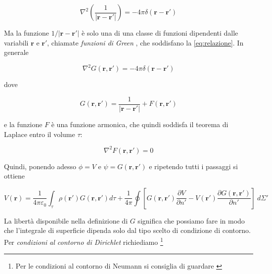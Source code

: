 \begin{equation}
    \nabla^2 \left (\frac{1}{|\mathbf{r} - \mathbf{r'}|} \right ) = - 4 \pi \delta (\mathbf{r} - \mathbf{r'})
    \label{eq:relazione}
\end{equation}

Ma la funzione $1 / |\mathbf{r} - \mathbf{r'}|$ è solo una di una classe di funzioni dipendenti dalle variabili $\mathbf{r}$ e $\mathbf{r'}$, chiamate \emph{funzioni di Green} , che soddisfano la \ref{eq:relazione}. In generale 

\begin{equation}
    \nabla ^2 G(\mathbf{r}, \mathbf{r'}) = -4 \pi \delta (\mathbf{r} -\mathbf{r'})
\end{equation}

dove

\begin{equation}
    G(\mathbf{r}, \mathbf{r'}) = \frac{1}{|\mathbf{r} - \mathbf{r'}|} + F(\mathbf{r}, \mathbf{r'})
    \label{eq:funzione_Green}
\end{equation}

e la funzione $F$ è una funzione armonica, che quindi soddisfa il teorema di Laplace entro il volume $\tau$:

\begin{equation*}
    \nabla ^2 F(\mathbf{r}, \mathbf{r'}) = 0
\end{equation*}

Quindi, ponendo adesso $\phi = V$ e $\psi = G(\mathbf{r}, \mathbf{r'})$ e ripetendo tutti i passaggi si ottiene 

\begin{tcolorbox}[colback=yellow!10!white, colframe=orange!70!black, boxrule=0.8pt]
\begin{equation}
    V(\mathbf{r}) = \frac{1}{4 \pi \varepsilon_{0}} \int_{\tau} \rho(\mathbf{r'}) G(\mathbf{r}, \mathbf{r'}) d \tau + \frac{1}{4 \pi} \oint \left [ G(\mathbf{r}, \mathbf{r'}) \frac{\partial V}{\partial n'} - V(\mathbf{r'}) \frac{\partial G(\mathbf{r}, \mathbf{r'})}{\partial n'} \right ] \ d \Sigma' 
    \label{eq:soluzione_generale_potenziale_contorno}
\end{equation}
\end{tcolorbox}

La libertà disponibile nella definizione di $G$ significa che possiamo fare in modo che l'integrale di superficie dipenda solo dal tipo scelto di condizione di contorno. \\

Per \emph{condizioni al contorno di Dirichlet} richiediamo \footnote{Per le condizioni al contorno di Neumann si consiglia di guardare \cite{ElettrodinamicaClassica}}

